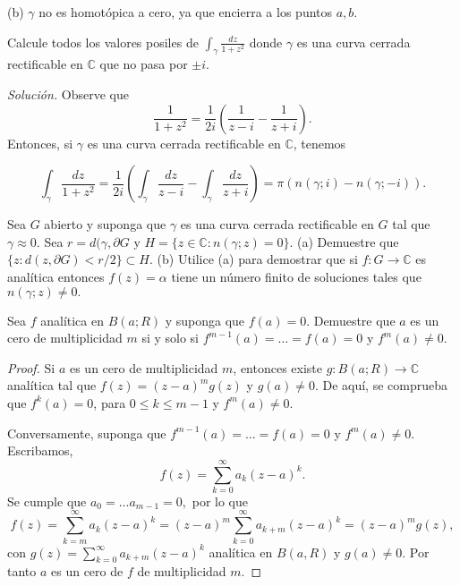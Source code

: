 \documentclass[12pt]{article}
\newcommand{\C}{\mathbb{C}}
\newenvironment{problem}[2][Problema]{\begin{trivlist}
\item[\hskip \labelsep {\bfseries #1}\hskip \labelsep {\bfseries #2.}]}{\end{trivlist}}
\begin{document}
(b) $\gamma$ no es homotópica a cero, ya que encierra a los puntos $a, b$.



\begin{problem}{10 pp. 95}
Calcule todos los valores posiles de $\int_\gamma \frac{dz}{1+z^2}$ donde $\gamma$ es una curva cerrada rectificable en $\C$ que no pasa por $\pm i.$
\end{problem}
\textit{Solución.} Observe que 
$$ \frac{1}{1+z^2} = \frac{1}{2i} \left( \frac{1}{z-i} - \frac{1}{z+i} \right). $$
Entonces, si $\gamma$ es una curva cerrada rectificable en $\C$, tenemos

$$ \int_\gamma \frac{dz}{1+z^2} = \frac{1}{2i}\left( \int_\gamma \frac{dz}{z-i} - \int_\gamma \frac{dz}{z+i} \right) = \pi ( n(\gamma; i) - n(\gamma; -i) ). $$


\begin{problem}{2 pp. 99}
Sea $G$ abierto y suponga que $\gamma$ es una curva cerrada rectificable en $G$ tal que $\gamma \approx 0$. Sea $r = d({\gamma}, \partial G$ y $H = \{z\in \C: n(\gamma; z) =0\}$. (a) Demuestre que $\{z: d(z, \partial G) < r/2\} \subset H$. (b) Utilice (a) para demostrar que si $f: G \rightarrow \C$ es analítica entonces $f(z) =\alpha$ tiene un número finito de soluciones tales que $n(\gamma; z) \neq 0.$
\end{problem}


\begin{problem}{3 pp. 99}
Sea $f$ analítica en $B(a; R)$ y suponga que $f(a) = 0$. Demuestre que $a$ es un cero de multiplicidad $m$ si y solo si $f^{m-1}(a) = \ldots = f(a) = 0$ y $f^{m}(a) \neq 0.$
\end{problem}
\begin{proof}
Si $a$ es un cero de multiplicidad $m$, entonces existe $g: B(a; R) \rightarrow \C$ analítica tal que $f(z) = (z-a)^m g(z)$ y $g(a) \neq 0.$ De aquí, se comprueba que $f^{k}(a) = 0$, para $0 \leq k \leq m-1$ y $f^{m}(a) \neq 0.$

Conversamente, suponga que $f^{m-1}(a) = \ldots = f(a) = 0$ y $f^{m}(a) \neq 0.$ Escribamos,
$$ f(z) = \sum_{k=0}^\infty a_k(z-a)^k. $$
Se cumple que $a_0 = \ldots a_{m-1} = 0,$ por lo que 
$$ f(z) = \sum_{k=m}^\infty a_k(z-a)^k = (z-a)^m \sum_{k=0}^\infty a_{k+m}(z-a)^k = (z-a)^m g(z),$$
con $g(z) = \sum_{k=0}^\infty a_{k+m}(z-a)^k$ analítica en $B(a,R)$ y $g(a) \neq 0.$ Por tanto $a$ es un cero de $f$ de multiplicidad $m.$
\end{proof}
\end{document}
